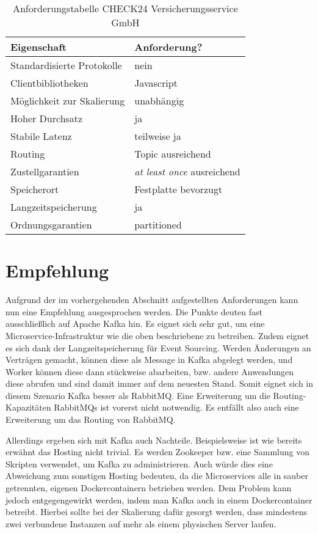 \begin{table}[b]
	\centering
	\begin{tabular}{|l|l|}
		\hline
		\textbf{Eigenschaft}      & \textbf{Anforderung?}              \\ \hline
		Standardisierte Protokolle & nein                               \\ \hline
		Clientbibliotheken & Javascript \\ \hline
		Möglichkeit zur Skalierung & unabhängig \\ \hline
		Hoher Durchsatz           & ja \\ \hline
		Stabile Latenz            & teilweise ja \\ \hline
		Routing & Topic ausreichend \\ \hline
		Zustellgarantien           & \textit{at least once} ausreichend \\ \hline
		Speicherort               & Festplatte bevorzugt               \\ \hline
		Langzeitspeicherung       & ja                   \\ \hline
		Ordnungsgarantien          & partitioned                        \\ \hline
	\end{tabular}
	\caption{Anforderungstabelle CHECK24 Versicherungsservice GmbH}
	\label{requirementsmatrix}
\end{table}

\section{Empfehlung}
Aufgrund der im vorhergehenden Abschnitt aufgestellten Anforderungen kann nun
eine Empfehlung ausgesprochen werden.
Die Punkte deuten fast ausschließlich auf Apache Kafka hin.
Es eignet sich sehr gut, um eine Microservice-In\-fra\-struk\-tur wie die oben
beschriebene zu betreiben. Zudem eignet es sich dank der Langzeitspeicherung für
Event Sourcing.
Werden Änderungen an Verträgen gemacht, können diese als Message in Kafka
abgelegt werden, und Worker können diese dann stückweise abarbeiten, bzw. andere
Anwendungen diese abrufen und sind damit immer auf dem neuesten Stand.
Somit eignet sich in diesem Szenario Kafka besser als RabbitMQ. Eine
Erweiterung um die Routing-Kapazitäten RabbitMQs ist vorerst nicht notwendig.
Es entfällt also auch eine Erweiterung um das Routing von RabbitMQ.

Allerdings ergeben sich mit Kafka auch Nachteile. Beispielsweise ist wie
bereits erwähnt das Hosting nicht trivial. Es werden Zookeeper bzw.
eine Sammlung von Skripten verwendet, um Kafka zu administrieren.
Auch würde dies eine Abweichung zum sonstigen Hosting bedeuten,
da die Microservices alle in sauber getrennten, eigenen Dockercontainern
betrieben werden.
Dem Problem kann jedoch entgegengewirkt werden, indem man Kafka auch
in einem Dockercontainer betreibt. Hierbei sollte bei der Skalierung dafür
gesorgt werden, dass mindestens zwei verbundene Instanzen auf mehr als
einem physischen Server laufen.

